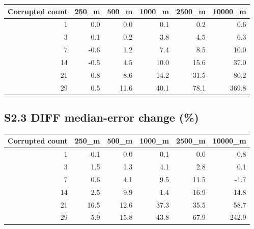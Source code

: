 \documentclass[journal,onecolumn,10pt]{IEEEtran}
\begin{document}
\begin{center}\begin{minipage}{\textwidth}\centering
{}

\begin{tabular}{@{}rrrrrr@{}}
\toprule\noalign{}
Corrupted count & 250\_m & 500\_m & 1000\_m & 2500\_m & 10000\_m \\
\midrule\noalign{}

1 & 0.0 & 0.0 & 0.1 & 0.2 & 0.6 \\
3 & 0.1 & 0.2 & 3.8 & 4.5 & 6.3 \\
7 & -0.6 & 1.2 & 7.4 & 8.5 & 10.0 \\
14 & -0.5 & 4.5 & 10.0 & 15.6 & 37.0 \\
21 & 0.8 & 8.6 & 14.2 & 31.5 & 80.2 \\
29 & 0.5 & 11.6 & 40.1 & 78.1 & 369.8 \\
\bottomrule
\end{tabular}
\end{minipage}\end{center}

\subsection*{S2.3 DIFF median-error change (\%)}\label{s2.3-diff-median-error-change}

\begin{center}\begin{minipage}{\textwidth}\centering
{}

\begin{tabular}{@{}rrrrrr@{}}
\toprule\noalign{}
Corrupted count & 250\_m & 500\_m & 1000\_m & 2500\_m & 10000\_m \\
\midrule\noalign{}

1 & -0.1 & 0.0 & 0.1 & 0.0 & -0.8 \\
3 & 1.5 & 1.3 & 4.1 & 2.8 & 0.1 \\
7 & 0.6 & 4.1 & 9.5 & 11.5 & -1.7 \\
14 & 2.5 & 9.9 & 1.4 & 16.9 & 14.8 \\
21 & 16.5 & 12.6 & 37.3 & 35.5 & 58.7 \\
29 & 5.9 & 15.8 & 43.8 & 67.9 & 242.9 \\
\bottomrule
\end{tabular}
\end{minipage}\end{center}
\end{document}
